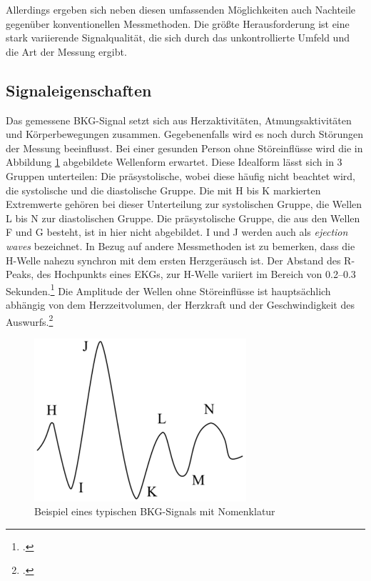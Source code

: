 	Allerdings ergeben sich neben diesen umfassenden Möglichkeiten auch Nachteile gegenüber konventionellen Messmethoden. Die größte Herausforderung ist eine stark variierende Signalqualität, die sich durch das unkontrollierte Umfeld und die Art der Messung ergibt.

	\subsection{Signaleigenschaften}
	
	Das gemessene \ac{BKG}-Signal setzt sich aus Herzaktivitäten, Atmungsaktivitäten und Körperbewegungen zusammen. Gegebenenfalls wird es noch durch Störungen der Messung beeinflusst. Bei einer gesunden Person ohne Störeinflüsse wird die in Abbildung \ref{fig:bcgwaveform} abgebildete Wellenform erwartet. Diese Idealform lässt sich in 3 Gruppen unterteilen: Die präsystolische, wobei diese häufig nicht beachtet wird, die systolische und die diastolische Gruppe. Die mit H bis K markierten Extremwerte gehören bei dieser Unterteilung zur systolischen Gruppe, die Wellen L bis N zur diastolischen Gruppe. Die präsystolische Gruppe, die aus den Wellen F und G besteht, ist in hier nicht abgebildet. I und J werden auch als \textit{ejection waves} bezeichnet. In Bezug auf andere Messmethoden ist zu bemerken, dass die H-Welle nahezu synchron mit dem ersten Herzgeräusch ist. Der Abstand des R-Peaks, des Hochpunkts eines \ac{EKG}s, zur H-Welle variiert im Bereich von \numrange{0,2}{0,3} Sekunden.\footcite[Vgl.][]{DELALLA1950} Die Amplitude der Wellen ohne Störeinflüsse ist hauptsächlich abhängig von dem Herzzeitvolumen, der Herzkraft und der Geschwindigkeit des Auswurfs.\footcite[Vgl.][]{Pinheiro2010}
	
	\begin{figure}[H]
		\centering
		\includegraphics[width=0.7\textwidth]{pic/bcgWaveform.png}
		\caption[Beispiel eines typischen \ac{BKG}-Signals mit Nomenklatur]{Beispiel eines typischen \ac{BKG}-Signals mit Nomenklatur\protect\footnotemark}
		\label{fig:bcgwaveform}
	\end{figure}
	
